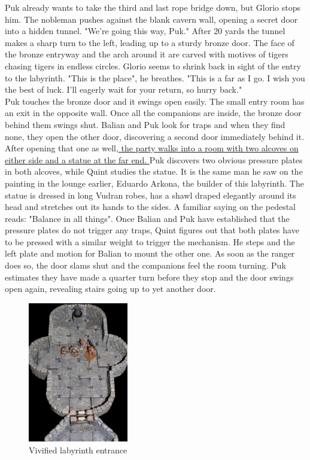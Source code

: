 Puk already wants to take the third and last rope bridge down, but Glorio stops him. The nobleman pushes against the blank cavern wall, opening a secret door into a hidden tunnel. "We're going this way, Puk." After 20 yards the tunnel makes a sharp turn to the left, leading up to a sturdy bronze door. The face of the bronze entryway and the arch around it are carved with motives of tigers chasing tigers in endless circles. Glorio seems to shrink back in sight of the entry to the labyrinth. "This is the place", he breathes. "This is a far as I go. I wish you the best of luck. I'll eagerly wait for your return, so hurry back."\\

Puk touches the bronze door and it swings open easily. The small entry room has an exit in the opposite wall. Once all the companions are inside, the bronze door behind them swings shut. Balian and Puk look for traps and when they find none, they open the other door, discovering a second door immediately behind it. After opening that one as well,\hyperref[fig:Vivified-labyrinth-entrance-563930398]{ the party walks into a room with two alcoves on either side and a statue at the far end. } Puk discovers two obvious pressure plates in both alcoves, while Quint studies the statue. It is the same man he saw on the painting in the lounge earlier, Eduardo Arkona, the builder of this labyrinth. The statue is dressed in long Vudran robes, has a shawl draped elegantly around its head and stretches out its hands to the sides. A familiar saying on the pedestal reads: "Balance in all things". Once Balian and Puk have established that the pressure plates do not trigger any traps, Quint figures out that both plates have to be pressed with a similar weight to trigger the mechanism. He steps and the left plate and motion for Balian to mount the other one. As soon as the ranger does so, the door slams shut and the companions feel the room turning. Puk estimates they have made a quarter turn before they stop and the door swings open again, revealing stairs going up to yet another door. \\

\begin{figure}[h]
	\centering
	\includegraphics[width=0.39\textwidth]{images/Vivified-labyrinth-entrance-563930398.jpg}
	\caption{Vivified labyrinth entrance}
	\label{fig:Vivified-labyrinth-entrance-563930398}
\end{figure}

